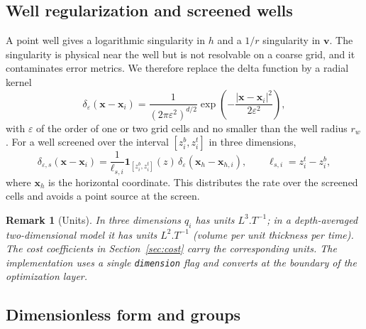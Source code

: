 \documentclass[11pt]{article}
\numberwithin{equation}{section}
\newcommand{\abs}[1]{\left\lvert #1 \right\rvert}
\newcommand{\xx}{\mathbf{x}}
\newcommand{\vv}{\mathbf{v}}
\newcommand{\ind}{\mathbf{1}}
\theoremstyle{plain}
\newtheorem{remark}{Remark}
\begin{document}
\subsection{Well regularization and screened wells}
\label{sec:wellreg}

A point well gives a logarithmic singularity in $h$ and a $1/r$ singularity in
$\vv$.  The singularity is physical near the well but is not resolvable on a
coarse grid, and it contaminates error metrics.  We therefore replace the
delta function by a radial kernel
\begin{equation}
\label{eq:deltaeps}
\delta_{\varepsilon}(\xx-\xx_i)
=\frac{1}{(2\pi\varepsilon^2)^{d/2}}
\exp\!\left(-\frac{\abs{\xx-\xx_i}^2}{2\varepsilon^2}\right),
\end{equation}
with $\varepsilon$ of the order of one or two grid cells and no smaller than
the well radius $r_w$.  For a well screened over the interval
$[z_i^b,z_i^t]$ in three dimensions,
\begin{equation}
\label{eq:screened}
\delta_{\varepsilon,s}(\xx-\xx_i)
=\frac{1}{\ell_{s,i}}\ind_{[z_i^b,z_i^t]}(z)\,
\delta_{\varepsilon}(\xx_h-\xx_{h,i}),
\qquad
\ell_{s,i}=z_i^t-z_i^b,
\end{equation}
where $\xx_h$ is the horizontal coordinate.  This distributes the rate over
the screened cells and avoids a point source at the screen.

\begin{remark}[Units]
In three dimensions $q_i$ has units $\si{L^3.T^{-1}}$; in a depth-averaged
two-dimensional model it has units $\si{L^2.T^{-1}}$ (volume per unit
thickness per time).  The cost coefficients in Section~\ref{sec:cost} carry
the corresponding units.  The implementation uses a single
\texttt{dimension} flag and converts at the boundary of the optimization
layer.
\end{remark}

\subsection{Dimensionless form and groups}
\label{sec:nondim}
\end{document}
